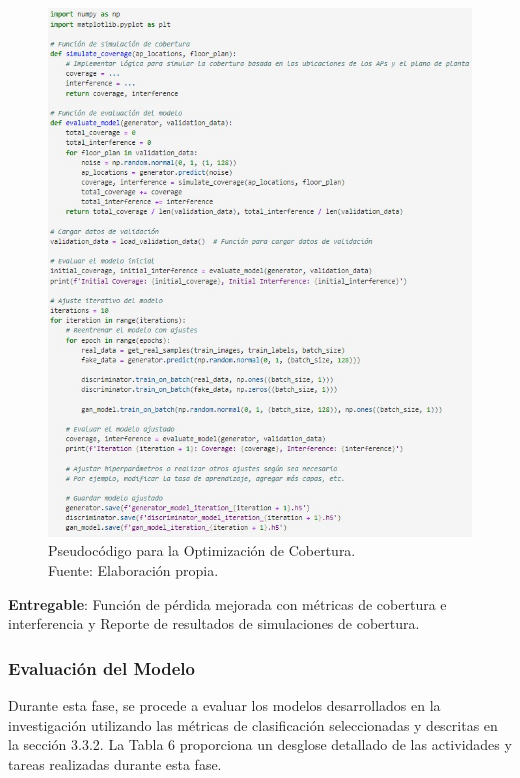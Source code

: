 \begin{figure}[H]
	\centering
	\includegraphics[width=1\textwidth]{3/figures/pseudo_cobert.jpg}
	\caption[Pseudocódigo para la Optimización de Cobertura]{Pseudocódigo para la Optimización de Cobertura.\\ Fuente: Elaboración propia.}
	\label{3:9}
\end{figure}

\textbf{Entregable}: Función de pérdida mejorada con métricas de cobertura e interferencia y Reporte de resultados de simulaciones de cobertura.

\subsubsection{Evaluación del Modelo}
Durante esta fase, se procede a evaluar los modelos desarrollados en la investigación utilizando las métricas de clasificación seleccionadas y descritas en la sección 3.3.2. La Tabla 6 proporciona un desglose detallado de las actividades y tareas realizadas durante esta fase.

